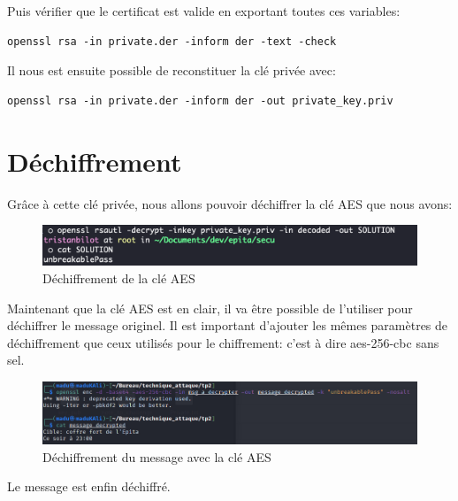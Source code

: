 \documentclass[12pt, oneside]{article}
\begin{document}
Puis vérifier que le certificat est valide en exportant toutes ces variables:
\begin{verbatim}
openssl rsa -in private.der -inform der -text -check
\end{verbatim}

Il nous est ensuite possible de reconstituer la clé privée avec:
\begin{verbatim}
openssl rsa -in private.der -inform der -out private_key.priv
\end{verbatim}

\section{Déchiffrement}

Grâce à cette clé privée, nous allons pouvoir déchiffrer la clé AES que nous avons:
\begin{figure}[ht]
\centering
\includegraphics[scale=0.6]{aes_key}
\caption{Déchiffrement de la clé AES}
\end{figure}

Maintenant que la clé AES est en clair, il va être possible de l'utiliser pour déchiffrer le message originel. Il est important d'ajouter les mêmes paramètres de déchiffrement que ceux utilisés pour le chiffrement: c'est à dire aes-256-cbc sans sel.
\begin{figure}[ht]
\centering
\includegraphics[scale=0.6]{answer}
\caption{Déchiffrement du message avec la clé AES}
\end{figure}
Le message est enfin déchiffré.
\end{document}
